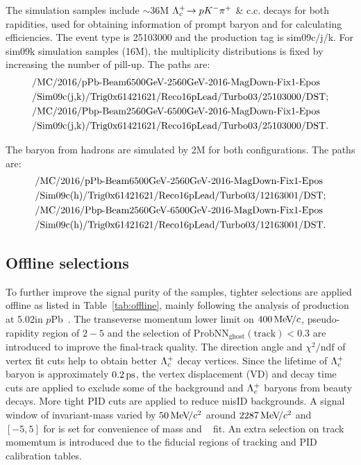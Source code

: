 The simulation samples include $\sim$36M ${{\Lambda}^+_{c}}\!\rightarrow {\ensuremath{p}}{\ensuremath{{K}^-}}{\ensuremath{{\pi}^+}}$ \& c.c. decays for both rapidities,
used for obtaining information of prompt \Lc baryon and for calculating efficiencies.
The event type is 25103000 and the production tag is sim09c/j/k.
For sim09k simulation samples (16M), the multiplicity distributions is fixed
by increasing the number of pill-up.
The paths are:
\begin{align*}\tiny
    &\text{/MC/2016/pPb-Beam6500GeV-2560GeV-2016-MagDown-Fix1-Epos} \\
    &\text{/Sim09c(j,k)/Trig0x61421621/Reco16pLead/Turbo03/25103000/DST}; \\
    &\text{/MC/2016/Pbp-Beam2560GeV-6500GeV-2016-MagDown-Fix1-Epos} \\
    &\text{/Sim09c(j,k)/Trig0x61421621/Reco16pLead/Turbo03/25103000/DST}.
\end{align*}

The \Lc baryon from \bquark hadrons are simulated by 2M \decay{\Lb}{\Lc\pim}for both configurations.
The paths are:
\begin{align*}\tiny
    &\text{/MC/2016/pPb-Beam6500GeV-2560GeV-2016-MagDown-Fix1-Epos} \\
    &\text{/Sim09c(h)/Trig0x61421621/Reco16pLead/Turbo03/12163001/DST}; \\
    &\text{/MC/2016/Pbp-Beam2560GeV-6500GeV-2016-MagDown-Fix1-Epos} \\
    &\text{/Sim09c(h)/Trig0x61421621/Reco16pLead/Turbo03/12163001/DST}.
\end{align*}

\subsection{Offline selections}

To further improve the signal purity of the samples,
tighter selections are applied offline as listed in Table~\ref{tab:offline},
mainly following the analysis of \Lc production at 5.02\tev in $p$Pb~\cite{LHCb-PAPER-2018-021}.
The transeverse momentum lower limit on $400\text{\,Me\kern -0.1em V\!/}c$,
pseudo-rapidity region of $2-5$ and the selection of $\mathrm{ProbNN_{ghost}(track)}<0.3$
are introduced to improve the final-track quality.
The direction angle and $\chi^2/\mathrm{ndf}$ of vertex fit cuts help to obtain better ${{\Lambda}^+_{c}}$ decay vertices.
Since the lifetime of ${{\Lambda}^+_{c}}$ baryon is approximately $0.2\text{\,ps}$,
the vertex displacement (VD) and decay time cuts are applied
to exclude some of the background and ${{\Lambda}^+_{c}}$ baryons from beauty decays.
More tight PID cuts are applied to reduce misID backgrounds.
A signal window of invariant-mass varied by $50\text{\,Me\kern -0.1em V\!/}c^2$ around $2287\text{\,Me\kern -0.1em V\!/}c^2$ and \logipchisq~ $[-5,5]$ for \Lc is set
for convenience of mass and \logipchisq~ fit.
An extra selection on track momemtum is introduced due to the fiducial regions of tracking and PID calibration tables.


